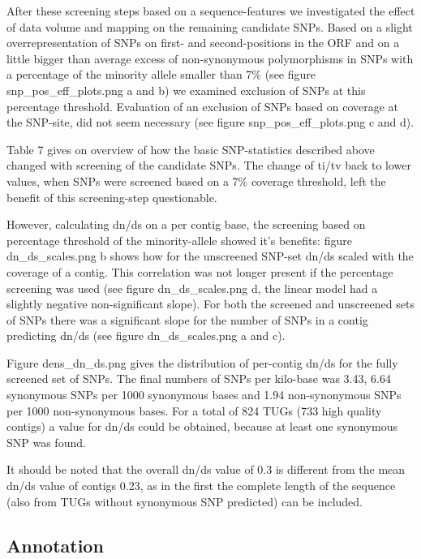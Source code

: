 \documentclass[10pt]{bmc_article}
\newenvironment{bmcformat}{\begin{raggedright}\baselineskip20pt\sloppy\setboolean{publ}{false}}{\end{raggedright}\baselineskip20pt\sloppy}
\begin{document}
\begin{bmcformat}
After these screening steps based on a sequence-features we
investigated the effect of data volume and mapping on the remaining
candidate SNPs. Based on a slight overrepresentation of SNPs on first-
and second-positions in the ORF and on a little bigger than average
excess of non-synonymous polymorphisms in SNPs with a percentage of
the minority allele smaller than 7\% (see figure
snp\_pos\_eff\_plots.png a and b) we examined exclusion of SNPs at
this percentage threshold. Evaluation of an exclusion of SNPs based on
coverage at the SNP-site, did not seem necessary (see figure
snp\_pos\_eff\_plots.png c and d).

Table 7 gives on overview of how the basic SNP-statistics described
above changed with screening of the candidate SNPs. The change of
ti/tv back to lower values, when SNPs were screened based on a 7\%
coverage threshold, left the benefit of this screening-step
questionable.

However, calculating dn/ds on a per contig base, the screening based
on percentage threshold of the minority-allele showed it's benefits:
figure dn\_ds\_scales.png b shows how for the unscreened SNP-set dn/ds
scaled with the coverage of a contig. This correlation was not longer
present if the percentage screening was used (see figure
dn\_ds\_scales.png d, the linear model had a slightly negative
non-significant slope). For both the screened and unscreened sets of
SNPs there was a significant slope for the number of SNPs in a contig
predicting dn/ds (see figure dn\_ds\_scales.png a and c).

Figure dens\_dn\_ds.png gives the distribution of per-contig dn/ds for
the fully screened set of SNPs. The final numbers of SNPs per
kilo-base was 3.43,
6.64 synonymous SNPs per 1000 synonymous
bases and 1.94 non-synonymous SNPs per
1000 non-synonymous bases. For a total of
824 TUGs
(733 high
  quality contigs) a value for dn/ds could be obtained, because at
  least one synonymous SNP was found.

  It should be noted that the overall dn/ds value of
  0.3 is different from the mean dn/ds value of contigs
  0.23, as in the
  first the complete length of the sequence (also from TUGs without
  synonymous SNP predicted) can be included.


\subsection*{Annotation}



\end{bmcformat}
\end{document}

